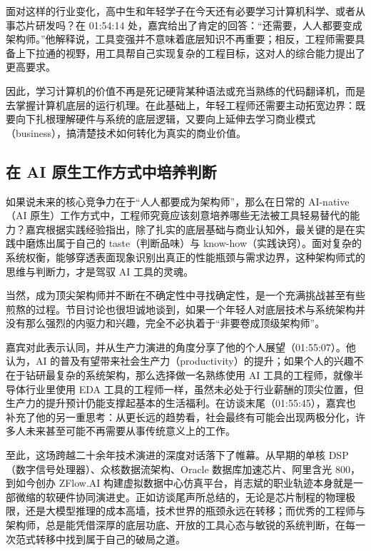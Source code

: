 \documentclass[UTF8,a4paper,11pt,fontset=fandol]{ctexart}
\begin{document}
面对这样的行业变化，高中生和年轻学子在今天还有必要学习计算机科学、或者从事芯片研发吗？在 01:54:14 处，嘉宾给出了肯定的回答：“还需要，人人都要变成架构师。”他解释说，工具变强并不意味着底层知识不再重要；相反，工程师需要具备上下拉通的视野，用工具帮自己实现复杂的工程目标，这对人的综合能力提出了更高要求。

因此，学习计算机的价值不再是死记硬背某种语法或充当熟练的代码翻译机，而是去掌握计算机底层的运行机理。在此基础上，年轻工程师还需要主动拓宽边界：既要向下扎根理解硬件与系统的底层逻辑，又要向上延伸去学习商业模式（business），搞清楚技术如何转化为真实的商业价值。

\subsection{在 AI 原生工作方式中培养判断}
如果说未来的核心竞争力在于“人人都要成为架构师”，那么在日常的 AI-native（AI 原生）工作方式中，工程师究竟应该刻意培养哪些无法被工具轻易替代的能力？嘉宾根据实践经验指出，除了扎实的底层基础与商业认知外，最关键的是在实践中磨炼出属于自己的 taste（判断品味）与 know-how（实践诀窍）。面对复杂的系统权衡，能够穿透表面现象识别出真正的性能瓶颈与需求边界，这种架构师式的思维与判断力，才是驾驭 AI 工具的灵魂。

当然，成为顶尖架构师并不断在不确定性中寻找确定性，是一个充满挑战甚至有些煎熬的过程。节目讨论也很坦诚地谈到，如果一个年轻人对底层技术与系统架构并没有那么强烈的内驱力和兴趣，完全不必执着于“非要卷成顶级架构师”。

嘉宾对此表示认同，并从生产力演进的角度分享了他的个人展望（01:55:07）。他认为，AI 的普及有望带来社会生产力（productivity）的提升；如果个人的兴趣不在于钻研最复杂的系统架构，那么选择做一名熟练使用 AI 工具的工程师，就像半导体行业里使用 EDA 工具的工程师一样，虽然未必处于行业薪酬的顶尖位置，但生产力的提升预计仍能支撑起基本的生活福利。在访谈末尾（01:55:45），嘉宾也补充了他的另一重思考：从更长远的趋势看，社会最终有可能会出现两极分化，许多人未来甚至可能不再需要从事传统意义上的工作。

至此，这场跨越二十余年技术演进的深度对话落下了帷幕。从早期的单核 DSP（数字信号处理器）、众核数据流架构、Oracle 数据库加速芯片、阿里含光 800，到如今创办 ZFlow.AI 构建虚拟数据中心仿真平台，肖志斌的职业轨迹本身就是一部微缩的软硬件协同演进史。正如访谈尾声所总结的，无论是芯片制程的物理极限，还是大模型推理的成本高墙，技术世界的瓶颈永远在转移；而优秀的工程师与架构师，总是能凭借深厚的底层功底、开放的工具心态与敏锐的系统判断，在每一次范式转移中找到属于自己的破局之道。
\end{document}

